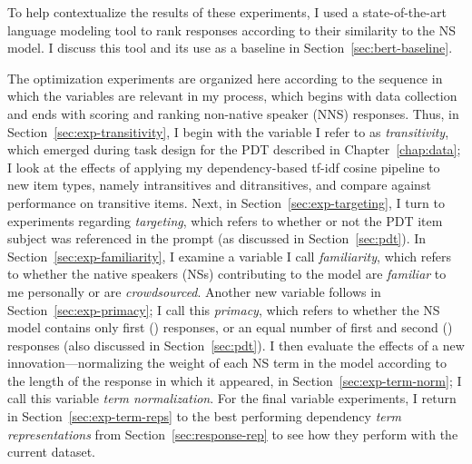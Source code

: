 
To help contextualize the results of these experiments, I used a state-of-the-art language modeling tool to rank responses according to their similarity to the NS model. I discuss this tool and its use as a baseline in Section~\ref{sec:bert-baseline}.

The optimization experiments are organized here according to the sequence in which the variables are relevant in my process, which begins with data collection and ends with scoring and ranking non-native speaker (NNS) responses. Thus, in Section~\ref{sec:exp-transitivity}, I begin with the variable I refer to as \textit{transitivity}, which emerged during task design for the PDT described in Chapter~\ref{chap:data}; I look at the effects of applying my dependency-based tf-idf cosine pipeline to new item types, namely intransitives and ditransitives, and compare against performance on transitive items. Next, in Section~\ref{sec:exp-targeting}, I turn to experiments regarding \textit{targeting}, which refers to whether or not the PDT item subject was referenced in the prompt (as discussed in Section~\ref{sec:pdt}). In Section~\ref{sec:exp-familiarity}, I examine a variable I call \textit{familiarity}, which refers to whether the native speakers (NSs) contributing to the model are \textit{familiar} to me personally or are \textit{crowdsourced}. Another new variable follows in Section~\ref{sec:exp-primacy}; I call this \textit{primacy}, which refers to whether the NS model contains only first () responses, or an equal number of first and second () responses (also discussed in Section~\ref{sec:pdt}). I then evaluate the effects of a new innovation---normalizing the weight of each NS term in the model according to the length of the response in which it appeared, in Section~\ref{sec:exp-term-norm}; I call this variable \textit{term normalization}. For the final variable experiments, I return in Section~\ref{sec:exp-term-reps} to the best performing dependency \textit{term representations} from Section~\ref{sec:response-rep} to see how they perform with the current dataset.

